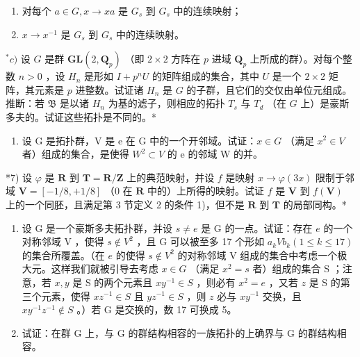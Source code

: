 \begin{enumerate}
\def\labelenumi{\arabic{enumi})}
\setcounter{enumi}{1}
\tightlist
\item
  对每个 \(a \in G, x \to xa\) 是 \(G_{s}\) 到 \(G_{s}\) 中的连续映射；
\item
  \(x \to x^{-1}\) 是 \(G_{s}\) 到 \(G_{s}\) 中的连续映射。
\end{enumerate}

\(^{*}c)\) 设 \(G\) 是群 \(\mathbf{GL}(2, \mathbf{Q}_p)\) （即 \(2 \times 2\) 方阵在 \(p\) 进域 \(\mathbf{Q}_p\) 上所成的群）。对每个整数 \(n > 0\) ，设 \(H_n\) 是形如 \(I + p^n U\) 的矩阵组成的集合，其中 \(U\) 是一个 \(2 \times 2\) 矩阵，其元素是 \(p\) 进整数。试证诸 \(H_n\) 是 \(G\) 的子群，且它们的交仅由单位元组成。推断：若 \(\mathfrak{B}\) 是以诸 \(H_n\) 为基的滤子，则相应的拓扑 \(T_s\) 与 \(T_d\) （在 \(G\) 上）是豪斯多夫的。试证这些拓扑是不同的。*

\begin{enumerate}
\def\labelenumi{\arabic{enumi})}
\setcounter{enumi}{5}
\tightlist
\item
  设 G 是拓扑群，V 是 e 在 G 中的一个开邻域。试证：\(x \in G\) （满足 \(x^{2} \in V\) 者）组成的集合，是使得 \(W^{2} \subset V\) 的 e 的邻域 W 的并。
\end{enumerate}

*7) 设 \(\varphi\) 是 \(\mathbf{R}\) 到 \(\mathbf{T} = \mathbf{R} / \mathbf{Z}\) 上的典范映射，并设 \(f\) 是映射 \(x \to \varphi(3x)\) 限制于邻域 \(\mathbf{V} = [-1/8, +1/8]\) （\(0\) 在 \(\mathbf{R}\) 中的）上所得的映射。试证 \(f\) 是 \(\mathbf{V}\) 到 \(f(\mathbf{V})\) 上的一个同胚，且满足第 3 节定义 2 的条件 1)，但不是 \(\mathbf{R}\) 到 \(\mathbf{T}\) 的局部同构。*

\begin{enumerate}
\def\labelenumi{\arabic{enumi})}
\setcounter{enumi}{7}
\item
设 G 是一个豪斯多夫拓扑群，并设 \(s \neq e\) 是 G 的一点。试证：存在 \(e\) 的一个对称邻域 V ，使得 \(s \notin V^2\) ，且 G 可以被至多 17 个形如 \(a_k V b_k (1 \leqslant k \leqslant 17)\) 的集合所覆盖。（在 \(e\) 的使得 \(s \notin V^2\) 的对称邻域 V 组成的集合中考虑一个极大元。这样我们就被引导去考虑 \(x \in G\) （满足 \(x^2 = s\) 者）组成的集合 S ；注意，若 \(x, y\) 是 S 的两个元素且 \(xy^{-1} \in S\) ，则必有 \(x^2 = e\) ，又若 \(z\) 是 S 的第三个元素，使得 \(xz^{-1} \in S\) 且 \(yz^{-1} \in S\) ，则 \(z\) 必与 \(xy^{-1}\) 交换，且 \(xy^{-1}z^{-1} \notin S\) 。）若 G 是交换的，数 17 可换成 5。
\item
  试证：在群 G 上，与 G 的群结构相容的一族拓扑的上确界与 G 的群结构相容。
\end{enumerate}

